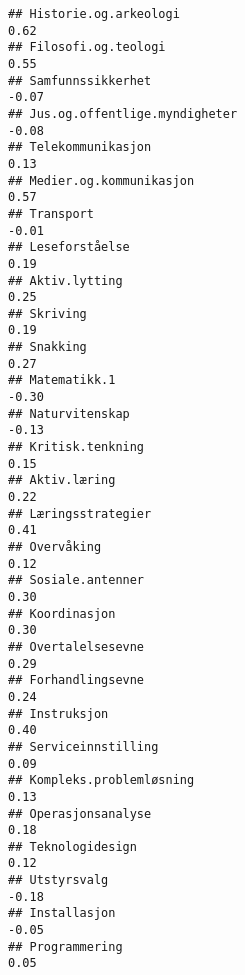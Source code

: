 \documentclass[
]{article}
\begin{document}
\begin{verbatim}
## Historie.og.arkeologi                                                             0.62
## Filosofi.og.teologi                                                               0.55
## Samfunnssikkerhet                                                                -0.07
## Jus.og.offentlige.myndigheter                                                    -0.08
## Telekommunikasjon                                                                 0.13
## Medier.og.kommunikasjon                                                           0.57
## Transport                                                                        -0.01
## Leseforståelse                                                                    0.19
## Aktiv.lytting                                                                     0.25
## Skriving                                                                          0.19
## Snakking                                                                          0.27
## Matematikk.1                                                                     -0.30
## Naturvitenskap                                                                   -0.13
## Kritisk.tenkning                                                                  0.15
## Aktiv.læring                                                                      0.22
## Læringsstrategier                                                                 0.41
## Overvåking                                                                        0.12
## Sosiale.antenner                                                                  0.30
## Koordinasjon                                                                      0.30
## Overtalelsesevne                                                                  0.29
## Forhandlingsevne                                                                  0.24
## Instruksjon                                                                       0.40
## Serviceinnstilling                                                                0.09
## Kompleks.problemløsning                                                           0.13
## Operasjonsanalyse                                                                 0.18
## Teknologidesign                                                                   0.12
## Utstyrsvalg                                                                      -0.18
## Installasjon                                                                     -0.05
## Programmering                                                                     0.05

\end{verbatim}
\end{document}
